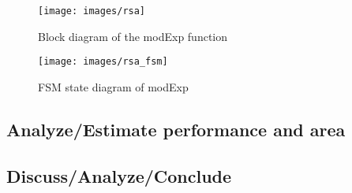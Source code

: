 \begin{figure}[htp]
    \centering
    \texttt{[image: images/rsa]}
    \caption{Block diagram of the modExp function}
    \label{fig:blockModExp}
\end{figure}

\begin{figure}[htp]
    \centering
    \texttt{[image: images/rsa\_fsm]}
    \caption{FSM state diagram of modExp}
    \label{fig:fsmModExp}
\end{figure}



\subsection{Analyze/Estimate performance and area}
\subsection{Discuss/Analyze/Conclude}
